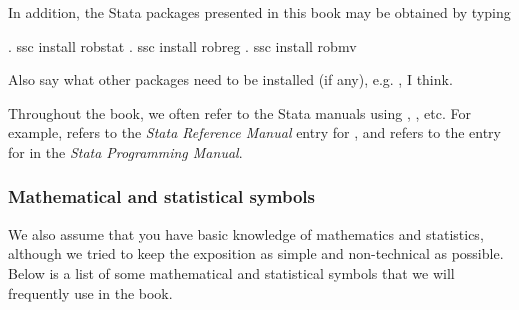 \noindent
In addition, the Stata packages presented in this book may be obtained by typing

\begin{stlog}
. ssc install robstat
\oom
. ssc install robreg
\oom
. ssc install robmv
\oom
\end{stlog}

\alert{Also say what other packages need to be installed (if any), e.g. , I think.}

Throughout the book, we often refer to the Stata manuals using \rref{\!}, \pref{\!}, etc.
For example,  refers to the \textsl{Stata Reference Manual} entry for
, and  refers to the entry for  in
the \textsl{Stata Programming Manual}.

\subsubsection*{Mathematical and statistical symbols}

We also assume that you have basic knowledge of mathematics and statistics,
although we tried to keep the exposition as simple and non-technical as
possible. Below is a list of some mathematical and statistical symbols that we
will frequently use in the book.

